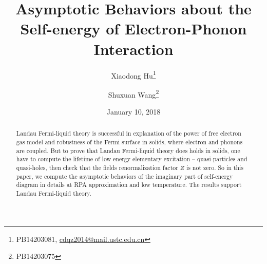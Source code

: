 \documentclass[prl,aps,twocolumn]{revtex4}
\begin{document}
\title{Asymptotic Behaviors about the Self-energy of Electron-Phonon Interaction}
\author{Xiaodong Hu\footnote{PB14203081, \url{cdqz2014@mail.ustc.edu.cn}}}
\author{Shuxuan Wang\footnote{PB14203075}}
\date{January 10, 2018}

\begin{abstract}
	Landau Fermi-liquid theory is successful in explanation of the power of free electron gas model and robustness of the Fermi surface in solids, where electron and phonons are coupled. But to prove that Landau Fermi-liquid theory does holds in solids, one have to compute the lifetime of low energy elementary excitation -- quasi-particles and quasi-holes, then check that the fields renormalization factor $Z$ is not zero. So in this paper, we compute the asymptotic behaviors of the imaginary part of self-energy diagram in details at RPA approximation and low temperature. The results support Landau Fermi-liquid theory.
\end{abstract}

\pacs{}
\maketitle
\end{document}
